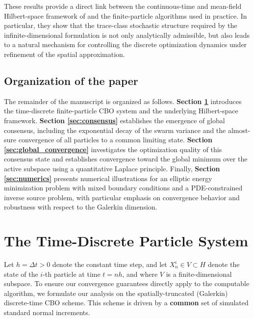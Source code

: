 \documentclass[12pt]{amsart}
\numberwithin{equation}{section}
\begin{document}
These results provide a direct link between the continuous-time and mean-field Hilbert-space framework of \cite{huang2026derivative} and the finite-particle algorithms used in practice. In particular, they show that the trace-class stochastic structure required by the infinite-dimensional formulation is not only analytically admissible, but also leads to a natural mechanism for controlling the discrete optimization dynamics under refinement of the spatial approximation.



\subsection{Organization of the paper}
The remainder of the manuscript is organized as follows. \textbf{Section \ref{sec:discrete_system}} introduces the time-discrete finite-particle CBO system and the underlying Hilbert-space framework. \textbf{Section \ref{sec:consensus}} establishes the emergence of global consensus, including the exponential decay of the swarm variance and the almost-sure convergence of all particles to a common limiting state. \textbf{Section \ref{sec:global_convergence}} investigates the optimization quality of this consensus state and establishes convergence toward the global minimum over the active subspace using a quantitative Laplace principle. Finally, \textbf{Section \ref{sec:numerics}} presents numerical illustrations for an elliptic energy minimization problem with mixed boundary conditions and a PDE-constrained inverse source problem, with particular emphasis on convergence behavior and robustness with respect to the Galerkin dimension.





\section{The Time-Discrete Particle System}\label{sec:discrete_system}

Let $h = \Delta t > 0$ denote the constant time step, and let $X_n^i \in V \subset H$ denote the state of the $i$-th particle at time $t = nh$, and where $V$ is a finite-dimensional subspace. To ensure our convergence guarantees directly apply to the computable algorithm, we formulate our analysis on the spatially-truncated (Galerkin) discrete-time CBO scheme. This scheme is driven by a \textbf{common} set of simulated standard normal increments.
\end{document}
